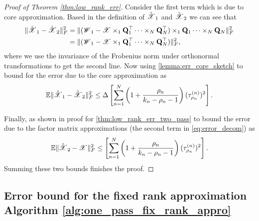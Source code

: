 \begin{proof}[Proof of Theorem \ref{thm:low_rank_err}]
Consider the first term which is due to core approximation. Based in the definition of $\hat{\T{X}}_1$ and $\tilde{\T{X}}_2$ we can see that 
\begin{align*}
\|\hat{\T{X}}_1 - \hat{\T{X}}_2\|^2_F &=
\|(\T{W}_1 - \T{X}\times_1 \mathbf{Q}_1^\top \cdots \times_N \mathbf{Q}^\top_N)\times_1 \mathbf{Q}_1\cdots \times_N \mathbf{Q}_N \|^2_F\\
& = \|(\T{W}_1- \T{X}\times_1 \mathbf{Q}_1^\top \cdots \times_N \mathbf{Q}^\top_N)\|_F^2,
\end{align*}
where we use the invariance of the Frobenius norm under orthonormal transformations to get the second line.
Now using \ref{lemma:err_core_sketch} to bound for the error due to the core approximation as
\begin{equation}
\mathbb{E} \|\hat{\T{X}}_1- \hat{\T{X}}_2\|^2_F \le \Delta \left[ \sum_{n=1}^N \left(1+\frac{\rho_n}{k_n-\rho_n-1}\right)(\tau^{(n)}_{\rho_n})^2\right].\nonumber
\end{equation}

Finally, as shown in proof for  \ref{thm:low_rank_err_two_pass} to
bound the error due to the factor matrix approximations
(the second term in \eqref{eq:error_decom}) as
\begin{equation}
\mathbb{E}\|\hat{\T{X}}_2 - \T{X} \|_F^2 \le \left[ \sum_{n=1}^N \left(1+\frac{\rho_n}{k_n-\rho_n-1}\right)(\tau^{(n)}_{\rho_n})^2\right].\nonumber
\end{equation}
Summing these two bounds finishes the proof.
\end{proof}

\subsection{Error bound for the fixed rank approximation Algorithm  \ref{alg:one_pass_fix_rank_appro}}

